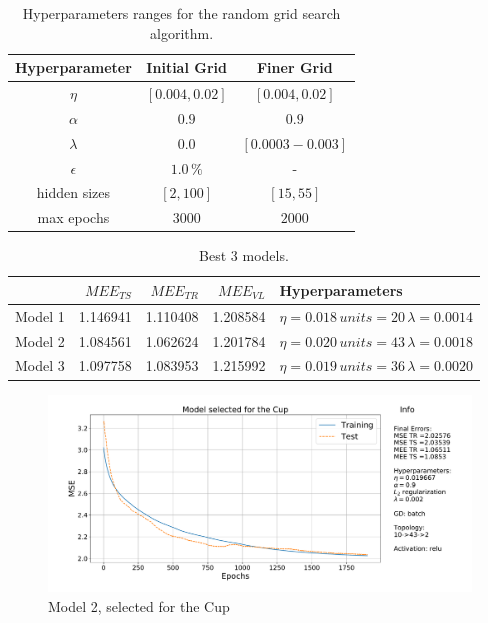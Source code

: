 \documentclass[11pt,twoside]{article}
\begin{document}
\begin{table}[htbp]
  \centering
  \begin{tabular}{ccc }
    \toprule
    Hyperparameter & Initial Grid & Finer Grid\\
    \midrule
    $\eta$ & $\left [ 0.004, 0.02 \right ]$ & $\left[0.004, 0.02 \right]$\\
    
    $\alpha$ & $0.9$ & $0.9$ \\

    $\lambda$ & $0.0$ & $[0.0003-0.003]$ \\

    $\epsilon$ & $1.0\,\%$ & -\\

    hidden sizes & $\left [ 2, 100 \right ]$ &  $\left [ 15, 55 \right ]$\\
    max epochs & $3000$  & $2000$ \\
    \midrule
  \end{tabular}
  \caption{Hyperparameters ranges for the random grid search algorithm.}
  \label{tab:hyper_ranges}
\end{table}


\begin{table}[htbp]
  \centering
\begin{tabular}{lrrrl}
\toprule
{} &  $MEE_{TS}$ &  $MEE_{TR}$ &    $MEE_{VL}$ & Hyperparameters\\
\midrule
Model 1 &  1.146941 &     1.110408 &  1.208584 & $\eta = 0.018\, units=20\, \lambda = 0.0014$\\
Model 2 &  1.084561 &     1.062624 &  1.201784 &$\eta = 0.020\, units=43\, \lambda = 0.0018$\\
Model 3 &  1.097758 &     1.083953 &  1.215992 & $\eta = 0.019\, units=36\, \lambda = 0.0020$\\
\bottomrule
\end{tabular}
\caption{ Best 3 models.}
  \label{tab:final-models}
\end{table}


\begin{figure}[htbp]
  \centering
  \includegraphics[width=1.0\textwidth]{img/final_model.pdf}
\caption{Model 2, selected for the Cup}
\label{fig:initial-grid}
  \end{figure}
\end{document}
